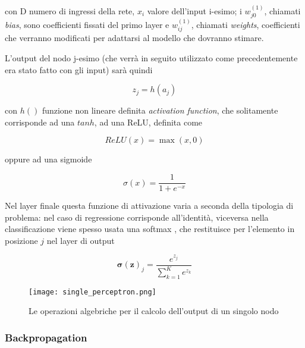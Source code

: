 con D numero di ingressi della rete, $x_i$ valore dell'input i-esimo; i $w_{j0}^{(1)}$, chiamati \textit{bias}, sono coefficienti fissati
del primo layer e 
$w_{ij}^{(1)}$, chiamati \textit{weights}, coefficienti che verranno modificati per adattarsi al modello che dovranno stimare.

L'output del nodo j-esimo (che verrà in seguito utilizzato come precedentemente era stato fatto con gli input) sarà quindi
\cite{bishop2006pattern}

\begin{equation}
    z_j = h(a_j)
    \label{eq:activation}
\end{equation}

con $h()$ funzione non lineare definita \textit{activation function}, che solitamente corrisponde ad una $tanh$, ad una 
ReLU, definita come \cite{Nwankpa2018}

\begin{equation}
    ReLU(x) = \max (x, 0)
    \label{eq:relu}
\end{equation}

\noindent
oppure ad una sigmoide \cite{Nwankpa2018}

\begin{equation}
    \sigma(x) = \frac{1}{1+e^{-x}}
    \label{eq:sigmoid}
\end{equation}


Nel layer finale questa funzione di attivazione varia a seconda della tipologia di problema: nel caso di regressione 
corrisponde all'identità, 
viceversa nella classificazione viene spesso usata una softmax \cite{Keck2014}, che restituisce per 
l'elemento in posizione $j$ nel layer di output 

\begin{equation}
    \mathbf{\sigma(z)}_j = \frac{e^{z_j}}{\sum_{k=1}^{K}e^{z_k}}
    \label{eq:softmax}
\end{equation}

\begin{figure}[h]
    \begin{small}
        \begin{center}
            \texttt{[image: single\_perceptron.png]}
        \end{center}
        \caption{Le operazioni algebriche per il calcolo dell'output di un singolo nodo}
        \label{fig:}
    \end{small}
\end{figure}

\subsubsection{Backpropagation} 
\label{section:backprop}

